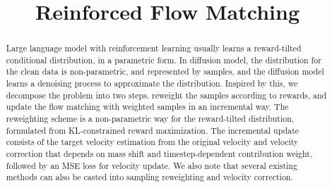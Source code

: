 \documentclass{article} %
\title{Reinforced Flow Matching}
\begin{document}
\maketitle

\begin{abstract}
Large language model with reinforcement learning
usually learns a reward-tilted conditional distribution,
in a parametric form.
In diffusion model,
the distribution for the clean data 
is non-parametric, and
represented by samples,
and the diffusion model learns a denoising process
to approximate the distribution.
Inspired by this,
we decompose the problem into two steps.
reweight the samples according to rewards,
and update the flow matching with weighted samples
in an incremental way.
The reweighting scheme is a non-parametric way for the reward-tilted distribution,
formulated
from KL-constrained reward maximization. 
The incremental update consists of the target velocity 
estimation from the original velocity
and velocity correction that depends on  mass shift 
and timestep-dependent contribution weight,
followed by an MSE loss for velocity update.
We also note that
several existing methods
can also be casted into 
sampling reweighting and 
velocity correction.


\end{abstract}




\end{document}
